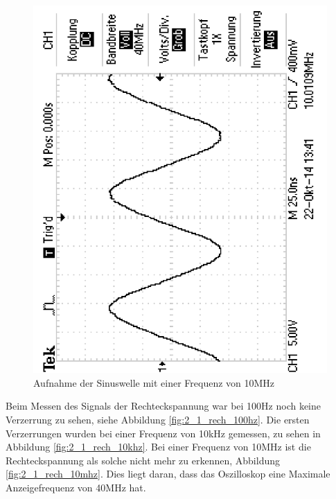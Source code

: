 \documentclass[12pt,a4paper]{article}
\begin{document}
\begin{figure}[H] 
  \centering
    \includegraphics[scale = 0.4, angle = -90]{2_1_sin_10mhz.pdf}
  	\caption[Aufnahme der Sinuswelle mit einer Frequenz von 10MHz]{Aufnahme der Sinuswelle mit einer Frequenz von 10MHz}
  \label{fig:2_1_sin_10mhz}
\end{figure}

Beim Messen des Signals der Rechteckspannung war bei 100Hz noch keine Verzerrung zu sehen, siehe Abbildung \ref{fig:2_1_rech_100hz}. Die ersten Verzerrungen wurden bei einer Frequenz von 10kHz gemessen, zu sehen in Abbildung \ref{fig:2_1_rech_10khz}. Bei einer Frequenz von 10MHz ist die Rechteckspannung als solche nicht mehr zu erkennen, Abbildung \ref{fig:2_1_rech_10mhz}. Dies liegt daran, dass das Oszilloskop eine Maximale Anzeigefrequenz von 40MHz hat.
\end{document}
